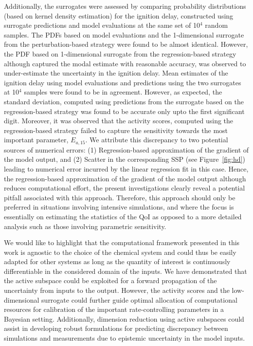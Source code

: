 Additionally, the surrogates were assessed by comparing probability distributions (based on kernel density estimation)
for the ignition delay, constructed using surrogate predictions and model evaluations at the same set of 10$^4$
random samples. The PDFs based on model evaluations and the 1-dimensional surrogate from the perturbation-based
strategy were found to be almost identical. However, the PDF based on 1-dimensional surrogate from the
regression-based strategy although captured the modal estimate with reasonable accuracy, was observed to
under-estimate the uncertainty in the ignition delay. Mean estimates of the ignition delay using model evaluations
and predictions using the two surrogates at 10$^4$ samples were found to be in agreement. However, as expected, the
standard deviation, computed using predictions from the surrogate based on the regression-based strategy was
found to be accurate only upto the first significant digit. Moreover, it was observed that the activity scores,
computed using the regression-based strategy failed to capture the sensitivity towards the 
most important parameter, $E_{a,15}$. 
We attribute this discrepancy to two potential sources of numerical errors: (1) Regression-based approximation of the
gradient of the model output, and (2) Scatter in the corresponding SSP (see Figure~\ref{fig:hd}) leading to numerical
error incurred by the linear regression fit in this case. Hence, the regression-based approximation of the gradient 
of the model output although reduces computational effort, the present investigations clearly reveal a potential pitfall associated
with this approach. Therefore, this approach should only be preferred in situations involving intensive simulations, and 
where the focus is essentially on estimating the statistics of the QoI as opposed to a more detailed analysis such as those involving
parametric sensitivity. 
 
 We would like to highlight that the computational framework presented in this work is agnostic to the choice
 of the chemical system and could thus be easily adapted for other systems as long as the quantity of interest
is continuously differentiable in the considered domain of the inputs.
We have demonstrated that the active subspace could be exploited for a forward propagation of
 the uncertainty from inputs to the output. However, the activity scores and the low-dimensional surrogate could further guide optimal allocation of computational resources for  
 calibration of the important rate-controlling parameters in a Bayesian setting. 
Additionally, dimension reduction using active subspaces could assist in developing robust formulations
for predicting discrepancy between simulations and measurements due to epistemic uncertainty in the model inputs.
